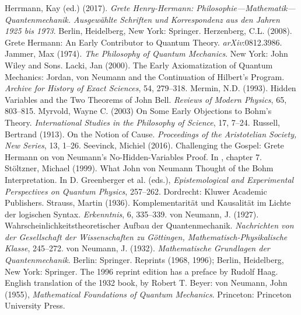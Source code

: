 \documentclass[12pt]{article}
\begin{document}
\begin{thebibliography}{99}
Herrmann, Kay (ed.) (2017). \emph{Grete Henry-Hermann: Philosophie---Mathematik---Quantenmechanik. Ausgew\"{a}hlte Schriften und Korrespondenz aus den Jahren 1925 bis 1973}.  Berlin, Heidelberg, New York: Springer.
Herzenberg, C.L. (2008). Grete Hermann: An Early Contributor to Quantum Theory. \emph{arXiv}:0812.3986.
Jammer, Max (1974). \emph{The Philosophy of Quantum Mechanics}. New York: John Wiley and Sons.
Lacki, Jan (2000). The Early Axiomatization of Quantum Mechanics: Jordan, von Neumann and the Continuation of Hilbert's Program. \emph{Archive for  History of Exact Sciences}, 54, 279--318.
Mermin, N.D. (1993). Hidden Variables and the Two Theorems of John Bell. \emph{Reviews of Modern Physics}, 65, 803--815.
Myrvold, Wayne C. (2003) On Some Early Objections to Bohm's Theory. \emph{International Studies in the Philosophy of Science}, 17, 7--24.
Russell, Bertrand (1913). On the Notion of Cause. \emph{Proceedings of the Aristotelian Society, New Series}, 13, 1--26.
Seevinck, Michiel (2016). Challenging the Gospel: Grete Hermann on von Neumann's No-Hidden-Variables Proof. In \cite{crull}, chapter 7.
St\"{o}ltzner, Michael (1999). What John von Neumann Thought of the Bohm Interpretation. In D. Greenberger et al. (eds.), \emph{Epistemological and Experimental Perspectives on Quantum Physics}, 257--262. Dordrecht: Kluwer Academic Publishers.
Strauss, Martin (1936). Komplementarit\"{a}t und Kausalit\"{a}t im Lichte der logischen Syntax. \emph{Erkenntnis}, 6, 335--339.
von Neumann, J. (1927). Wahrscheinlichkeitstheoretischer Aufbau der Quantenmechanik. \emph{Nachrichten von der Gesellschaft der Wissenschaften zu G\"{o}ttingen, Mathematisch-Physikalische Klasse}, 245--272.
von Neumann, J. (1932). \emph{Mathematische Grundlagen der Quantenmechanik}. Berlin: Springer. Reprints (1968, 1996); Berlin, Heidelberg, New York: Springer. The 1996 reprint edition has a preface by Rudolf Haag.  English translation of the 1932 book, by Robert T. Beyer: von Neumann, John (1955), \emph{Mathematical Foundations of Quantum Mechanics}. Princeton: Princeton University Press.


\end{thebibliography}
\end{document}
